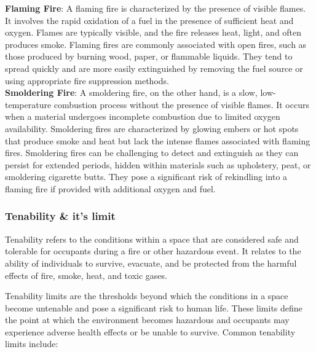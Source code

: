\documentclass{article}
\begin{document}
\textbf{Flaming Fire}: A flaming fire is characterized by the presence of visible flames. It involves the rapid oxidation of a fuel in the presence of sufficient heat and oxygen. Flames are typically visible, and the fire releases heat, light, and often produces smoke. Flaming fires are commonly associated with open fires, such as those produced by burning wood, paper, or flammable liquids. They tend to spread quickly and are more easily extinguished by removing the fuel source or using appropriate fire suppression methods.\\

\textbf{Smoldering Fire}: A smoldering fire, on the other hand, is a slow, low-temperature combustion process without the presence of visible flames. It occurs when a material undergoes incomplete combustion due to limited oxygen availability. Smoldering fires are characterized by glowing embers or hot spots that produce smoke and heat but lack the intense flames associated with flaming fires. Smoldering fires can be challenging to detect and extinguish as they can persist for extended periods, hidden within materials such as upholstery, peat, or smoldering cigarette butts. They pose a significant risk of rekindling into a flaming fire if provided with additional oxygen and fuel.

\subsubsection*{Tenability \& it's limit}
Tenability refers to the conditions within a space that are considered safe and tolerable for occupants during a fire or other hazardous event. It relates to the ability of individuals to survive, evacuate, and be protected from the harmful effects of fire, smoke, heat, and toxic gases.

Tenability limits are the thresholds beyond which the conditions in a space become untenable and pose a significant risk to human life. These limits define the point at which the environment becomes hazardous and occupants may experience adverse health effects or be unable to survive. Common tenability limits include:
\end{document}

